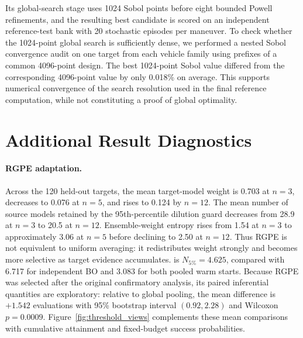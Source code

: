 \documentclass[11pt]{article}
\begin{document}
 Its global-search stage uses 1024 Sobol points before eight bounded Powell refinements, and the resulting best candidate is scored on an independent reference-test bank with 20 stochastic episodes per maneuver. To check whether the 1024-point global search is sufficiently dense, we performed a nested Sobol convergence audit on one target from each vehicle family using prefixes of a common 4096-point design. The best 1024-point Sobol value differed from the corresponding 4096-point value by only 0.018\% on average. This supports numerical convergence of the search resolution used in the final reference computation, while not constituting a proof of global optimality.

\section{Additional Result Diagnostics}

\paragraph{RGPE adaptation.}
Across the 120 held-out targets, the mean target-model weight is 0.703 at $n=3$, decreases to 0.076 at $n=5$, and rises to 0.124 by $n=12$. The mean number of source models retained by the 95th-percentile dilution guard decreases from 28.9 at $n=3$ to 20.5 at $n=12$. Ensemble-weight entropy rises from 1.54 at $n=3$ to approximately 3.06 at $n=5$ before declining to 2.50 at $n=12$. Thus RGPE is not equivalent to uniform averaging: it redistributes weight strongly and becomes more selective as target evidence accumulates.  is $N_{5\%}=4.625$, compared with 6.717 for independent BO and 3.083 for both pooled warm starts. Because RGPE was selected after the original confirmatory analysis, its paired inferential quantities are exploratory: relative to global pooling, the mean difference is $+1.542$ evaluations with 95\% bootstrap interval $(0.92,2.28)$ and Wilcoxon $p=0.0009$. Figure~\ref{fig:threshold_views} complements these mean comparisons with cumulative attainment and fixed-budget success probabilities.
\end{document}
